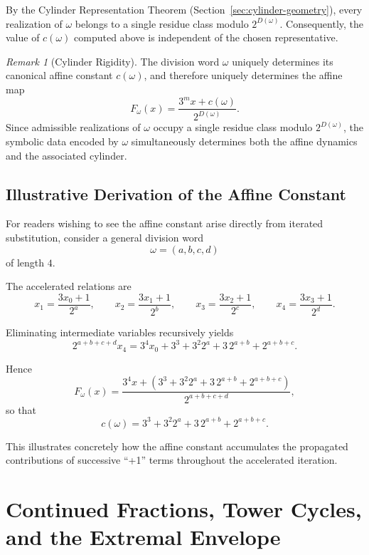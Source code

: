 \documentclass[12pt, oneside]{article}
\numberwithin{equation}{section}
\theoremstyle{definition}
\theoremstyle{plain}
\theoremstyle{remark}
\newtheorem*{remark}{Remark}
\begin{document}
By the Cylinder Representation Theorem (Section~\ref{sec:cylinder-geometry}), every
realization of \(\omega\) belongs to a single residue class modulo \(2^{D(\omega)}\).
Consequently, the value of \(c(\omega)\) computed above is independent of the chosen
representative.

\begin{remark}[Cylinder Rigidity]
The division word $\omega$ uniquely determines its canonical affine
constant $c(\omega)$, and therefore uniquely determines the affine map
\[
F_\omega(x) = \frac{3^m x+c(\omega)}{2^{D(\omega)}}.
\]
Since admissible realizations of $\omega$ occupy a single residue class
modulo $2^{D(\omega)}$, the symbolic data encoded by $\omega$
simultaneously determines both the affine dynamics and the associated
cylinder.
\end{remark}


\subsection{Illustrative Derivation of the Affine Constant}

For readers wishing to see the affine constant arise directly from
iterated substitution, consider a general division word
\[
\omega=(a,b,c,d)
\]
of length \(4\).

The accelerated relations are
\[
x_1=\frac{3x_0+1}{2^a},
\qquad
x_2=\frac{3x_1+1}{2^b},
\qquad
x_3=\frac{3x_2+1}{2^c},
\qquad
x_4=\frac{3x_3+1}{2^d}.
\]

Eliminating intermediate variables recursively yields
\[
2^{a+b+c+d}x_4
=
3^4x_0
+
3^3
+
3^2 2^a
+
3\,2^{a+b}
+
2^{a+b+c}.
\]

Hence
\[
F_\omega(x)
=
\frac{
3^4x
+
\left(
3^3
+
3^2 2^a
+
3\,2^{a+b}
+
2^{a+b+c}
\right)
}{
2^{a+b+c+d}
},
\]
so that
\[
c(\omega)
=
3^3
+
3^2 2^a
+
3\,2^{a+b}
+
2^{a+b+c}.
\]

This illustrates concretely how the affine constant accumulates the
propagated contributions of successive ``+1'' terms throughout the
accelerated iteration.

\newpage
\section{Continued Fractions, Tower Cycles, and the Extremal Envelope}
\label{app:continued-fractions}
\end{document}
